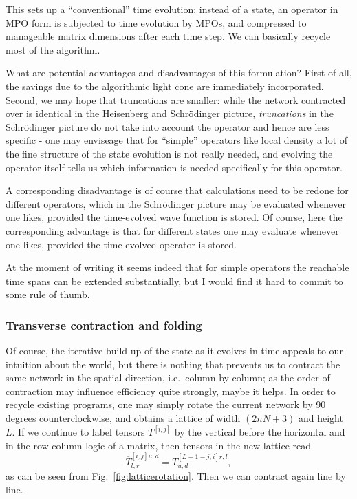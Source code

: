This sets up a ``conventional'' time evolution: instead of a state, an operator in MPO form is subjected to time evolution by MPOs, and compressed to manageable matrix dimensions after each time step. We can basically recycle most of the algorithm. 

What are potential advantages and disadvantages of this formulation? First of all, the savings due to the algorithmic light cone are immediately incorporated. Second, we may hope that truncations are smaller: while the network contracted over is identical in the Heisenberg and Schr\"{o}dinger picture, {\em truncations} in the Schr\"{o}dinger picture do not take into account the operator and hence are less specific - one may enviseage that for ``simple'' operators like local density a lot of the fine structure of the state evolution is not really needed, and evolving the operator itself tells us which information is needed specifically for this operator. 

A corresponding disadvantage is of course that calculations need to be redone for different operators, which in the Schr\"{o}dinger picture may be evaluated whenever one likes, provided the time-evolved wave function is stored. Of course, here the corresponding advantage is that for different states one may evaluate whenever one likes, provided the time-evolved operator is stored. 

At the moment of writing it seems indeed that for simple operators the reachable time spans can be extended substantially, but I would find it hard to commit to some rule of thumb. 

\subsubsection{Transverse contraction and folding}

Of course, the iterative build up of the state as it evolves in time appeals to our intuition about the world, but there is nothing that prevents us to contract the same network in the spatial direction, i.e.\ column by column; as the order of contraction may influence efficiency quite strongly, maybe it helps. In order to recycle existing programs, one may simply rotate the current network by 90 degrees counterclockwise, and obtains a lattice of width $(2nN+3)$ and height $L$. If we continue to label tensors $T^{[i,j]}$ by the vertical before the horizontal and in the row-column logic of a matrix, then tensors in the new lattice read
\begin{equation}
\overline{T}^{[i,j] u,d}_{l,r} = T^{[L+1-j,i] r,l}_{u,d} ,
\end{equation}
as can be seen from Fig.~\ref{fig:latticerotation}. Then we can contract again line by line.

